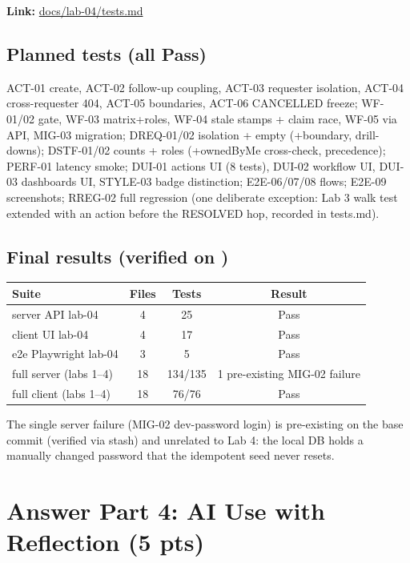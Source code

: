 \documentclass[11pt,a4paper]{article}
\begin{document}
\textbf{Link:} \href{https://github.com/thhanabun/Software\_Eng\_Lab/blob/main/docs/lab-04/tests.md}{docs/lab-04/tests.md}

\subsection*{Planned tests (all Pass)}
ACT-01 create, ACT-02 follow-up coupling, ACT-03 requester isolation, ACT-04
cross-requester 404, ACT-05 boundaries, ACT-06 CANCELLED freeze; WF-01/02 gate,
WF-03 matrix+roles, WF-04 stale stamps + claim race, WF-05 via API, MIG-03 migration;
DREQ-01/02 isolation + empty (+boundary, drill-downs); DSTF-01/02 counts + roles
(+ownedByMe cross-check, precedence); PERF-01 latency smoke; DUI-01 actions UI (8 tests),
DUI-02 workflow UI, DUI-03 dashboards UI, STYLE-03 badge distinction; E2E-06/07/08 flows;
E2E-09 screenshots; RREG-02 full regression (one deliberate exception: Lab 3 walk test
extended with an action before the RESOLVED hop, recorded in tests.md).

\subsection*{Final results (verified on )}
\begin{longtable}{@{} l c c c @{}}
\toprule
\textbf{Suite} & \textbf{Files} & \textbf{Tests} & \textbf{Result} \\
\midrule
server API lab-04 & 4 & 25 & Pass \\
client UI lab-04 & 4 & 17 & Pass \\
e2e Playwright lab-04 & 3 & 5 & Pass \\
full server (labs 1--4) & 18 & 134/135 & 1 pre-existing MIG-02 failure \\
full client (labs 1--4) & 18 & 76/76 & Pass \\
\bottomrule
\end{longtable}

\noindent The single server failure (MIG-02 dev-password login) is pre-existing on the base
commit (verified via stash) and unrelated to Lab 4: the local DB holds a manually changed
password that the idempotent seed never resets.

\section*{Answer Part 4: AI Use with Reflection (5 pts)}
\end{document}
